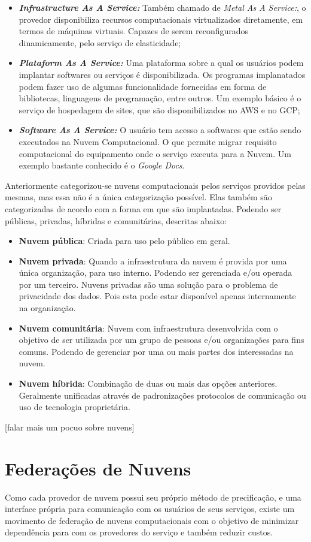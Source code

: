 \begin{itemize}
	\item \textbf{\textit{Infrastructure As A Service:}} Também chamado de \textit{Metal As A Service:}, o provedor disponibiliza recursos computacionais virtualizados diretamente, em termos de máquinas virtuais. Capazes de serem reconfigurados dinamicamente, pelo serviço de elasticidade;
	\item \textbf{\textit{Plataform As A Service:}} Uma plataforma sobre a qual os usuários podem implantar softwares ou serviços é disponibilizada. Os programas implanatados podem fazer uso de algumas funcionalidade fornecidas em forma de bibliotecas, linguagens de programação, entre outros. Um exemplo básico é o serviço de hospedagem de sites, que são disponibilizados no \acrshort{AWS} e no \acrshort{GCP};
	\item \textbf{\textit{Software As A Service:}} O usuário tem acesso a softwares que estão sendo executados na Nuvem Computacional. O que permite migrar requisito computacional do equipamento onde o serviço executa para a Nuvem. Um exemplo bastante conhecido é o \textit{Google Docs}\cite{GoogleDocs}.
\end{itemize}

Anteriormente categorizou-se nuvens computacionais pelos serviços providos pelas mesmas, mas essa não é a única categorização possível. Elas também são categorizadas de acordo com a forma em que são implantadas. Podendo ser públicas, privadas, híbridas e comunitárias, descritas abaixo\cite{NIST_CLOUD_DEFINITION}:

\begin{itemize}
	\item \textbf{Nuvem pública}: Criada para uso pelo público em geral.
	\item \textbf{Nuvem privada}: Quando a infraestrutura da nuvem é provida por uma única organização, para uso interno. Podendo ser gerenciada e/ou operada por um terceiro. Nuvens privadas são uma solução para o problema de privacidade dos dados. Pois esta pode estar disponível apenas internamente na organização.
	\item \textbf{Nuvem comunitária}: Nuvem com infraestrutura desenvolvida com o objetivo de ser utilizada por um grupo de pessoas e/ou organizações para fins comuns. Podendo de gerenciar por uma ou mais partes dos interessadas na nuvem.
	\item \textbf{Nuvem híbrida}: Combinação de duas ou mais das opções anteriores. Geralmente unificadas através de padronizações protocolos de comunicação ou uso de tecnologia proprietária.
\end{itemize}

[falar mais um pocuo sobre nuvens]

\section{Federações de Nuvens}

Como cada provedor de nuvem possui seu próprio método de precificação, e uma interface própria para comunicação com os usuários de seus serviços, existe um movimento de federação de nuvens computacionais com o objetivo de minimizar dependência para com os provedores do serviço e também reduzir custos.

